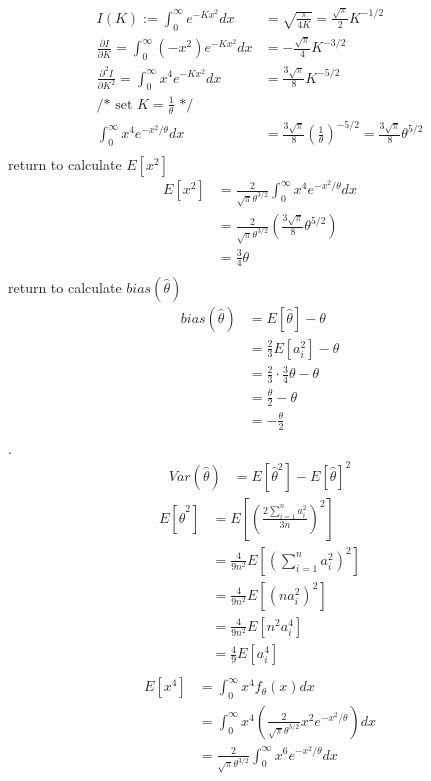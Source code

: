 \documentclass[12pt,border=4pt,multi]{article} %
\begin{document}
\begin{align*}
I(K) := \int_0^{\infty} e^{-Kx^2} dx &= \sqrt{\frac{\pi}{4K}} = \frac{\sqrt{\pi}}{2}K^{-1 / 2}\\
\frac{\partial I}{\partial K} = \int_0^{\infty} (-x^2)e^{-Kx^2} dx &= -\frac{\sqrt{\pi}}{4}K^{-3 / 2}\\
\frac{\partial^2 I}{\partial K^2} = \int_0^{\infty} x^4 e^{-Kx^2} dx &= \frac{3\sqrt{\pi}}{8}K^{-5 / 2}\\
\text{/* set } K = \frac{1}{\theta} \text{ */}\\
\int_0^{\infty} x^4 e^{-x^2 / \theta} dx &= \frac{3\sqrt{\pi}}{8}\left(\frac{1}{\theta}\right)^{-5 / 2}
= \frac{3\sqrt{\pi}}{8}\theta^{5 / 2}\\
\end{align*}
return to calculate $E[x^2]$
\begin{align*}
E[x^2] &= \frac{2}{\sqrt{\pi}\theta^{3 / 2}} \int_0^{\infty} x^4 e^{-x^2 / \theta} dx\\
&= \frac{2}{\sqrt{\pi}\theta^{3 / 2}} \left(\frac{3\sqrt{\pi}}{8}\theta^{5 / 2}\right)\\
&= \frac{3}{4}\theta\\
\end{align*}
return to calculate $bias(\hat{\theta})$
\begin{align*}
bias(\hat{\theta}) &= E[\hat{\theta}] - \theta\\
&= \frac{2}{3} E[a_i^2] - \theta\\
&= \frac{2}{3}\cdot\frac{3}{4}\theta - \theta\\
&= \frac{\theta}{2} - \theta\\
&= \boxed{-\frac{\theta}{2}}\\
\end{align*}
\newpage
{}.
\begin{align*}
Var(\hat{\theta}) &= E[\hat{\theta}^2] - E[\hat{\theta}]^2
\end{align*}
\begin{align*}
E[\hat{\theta}^2] &= E\left[\left(\frac{2\sum_{i = 1}^n a_i^2}{3n}\right)^2\right]\\
&= \frac{4}{9n^2}E\left[\left(\sum_{i = 1}^n a_i^2\right)^2\right]\\
&= \frac{4}{9n^2}E\left[(n a_i^2)^2\right]\\
&= \frac{4}{9n^2}E\left[n^2 a_i^4\right]\\
&= \frac{4}{9}E\left[a_i^4\right]\\
\end{align*}
\begin{align*}
E[x^4] &= \int_0^{\infty} x^4 f_\theta(x) dx\\
&= \int_0^{\infty} x^4 \left(\frac{2}{\sqrt{\pi}\theta^{3 / 2}} x^2 e^{-x^2 / \theta}\right) dx\\
&= \frac{2}{\sqrt{\pi}\theta^{3 / 2}} \int_0^{\infty} x^6 e^{-x^2 / \theta} dx\\
\end{align*}
\end{document}
